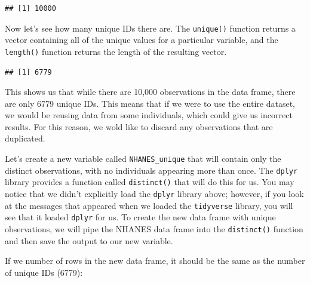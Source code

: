 \documentclass[12pt,]{book}
\newenvironment{Shaded}{\begin{snugshade}}{\end{snugshade}}
\newcommand{\DataTypeTok}[1]{\textcolor[rgb]{0.13,0.29,0.53}{#1}}
\newcommand{\KeywordTok}[1]{\textcolor[rgb]{0.13,0.29,0.53}{\textbf{#1}}}
\newcommand{\NormalTok}[1]{#1}
\newcommand{\OperatorTok}[1]{\textcolor[rgb]{0.81,0.36,0.00}{\textbf{#1}}}
\newcommand{\OtherTok}[1]{\textcolor[rgb]{0.56,0.35,0.01}{#1}}
\newcommand{\StringTok}[1]{\textcolor[rgb]{0.31,0.60,0.02}{#1}}
\begin{document}
\begin{verbatim}
## [1] 10000
\end{verbatim}

Now let's see how many unique IDs there are. The \texttt{unique()} function returns a vector containing all of the unique values for a particular variable, and the \texttt{length()} function returns the length of the resulting vector.

\begin{Shaded}
\end{Shaded}

\begin{verbatim}
## [1] 6779
\end{verbatim}

This shows us that while there are 10,000 observations in the data frame, there are only 6779 unique IDs. This means that if we were to use the entire dataset, we would be reusing data from some individuals, which could give us incorrect results. For this reason, we wold like to discard any observations that are duplicated.

Let's create a new variable called \texttt{NHANES\_unique} that will contain only the distinct observations, with no individuals appearing more than once. The \texttt{dplyr} library provides a function called \texttt{distinct()} that will do this for us. You may notice that we didn't explicitly load the \texttt{dplyr} library above; however, if you look at the messages that appeared when we loaded the \texttt{tidyverse} library, you will see that it loaded \texttt{dplyr} for us. To create the new data frame with unique observations, we will pipe the NHANES data frame into the \texttt{distinct()} function and then save the output to our new variable.

\begin{Shaded}
\end{Shaded}

If we number of rows in the new data frame, it should be the same as the number of unique IDs (6779):
\end{document}
